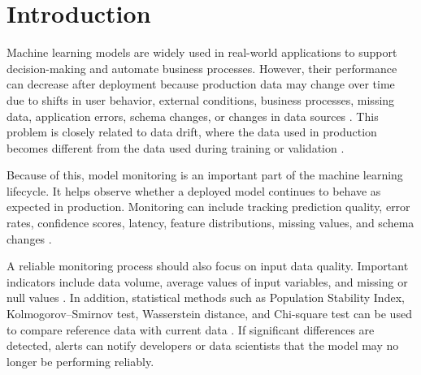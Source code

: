 \documentclass[11pt,a4paper,oneside]{book}
\begin{document}
\frontmatter
\pagestyle{empty}







\clearpage


\clearpage


\clearpage

\mainmatter
\pagestyle{headings}

\setcounter{page}{8}

\tableofcontents
\clearpage

\chapter*{Introduction}

Machine learning models are widely used in real-world applications to support decision-making and automate business processes. However, their performance can decrease after deployment because production data may change over time due to shifts in user behavior, external conditions, business processes, missing data, application errors, schema changes, or changes in data sources \cite{MonitoringPerformance,MachineLearningModelinProduction}. This problem is closely related to data drift, where the data used in production becomes different from the data used during training or validation \cite{MonitoringPerformance}.

Because of this, model monitoring is an important part of the machine learning lifecycle. It helps observe whether a deployed model continues to behave as expected in production. Monitoring can include tracking prediction quality, error rates, confidence scores, latency, feature distributions, missing values, and schema changes \cite{MonitoringPerformance}.

A reliable monitoring process should also focus on input data quality. Important indicators include data volume, average values of input variables, and missing or null values \cite{MonitoringPerformance}. In addition, statistical methods such as Population Stability Index, Kolmogorov--Smirnov test, Wasserstein distance, and Chi-square test can be used to compare reference data with current data \cite{EvidentlyDataDriftLargeDatasets,SciPyDocumentation}. If significant differences are detected, alerts can notify developers or data scientists that the model may no longer be performing reliably.
\end{document}
